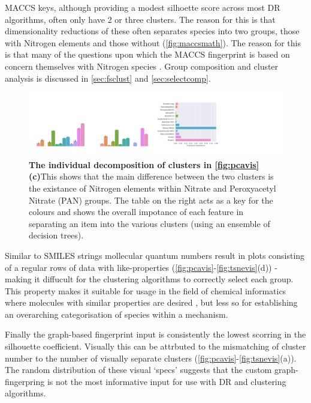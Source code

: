 MACCS keys, although providing a modest silhoette score across most DR algorithms, often only have 2 or three clusters. The reason for this is that dimensionality reductions of these often separates species into two groups, those with Nitrogen elements and those without (\autoref{fig:maccsmath}). The reason for this is that many of the questions upon which the MACCS fingerprint is based on concern themselves with Nitrogen species \citep{rdkitcode}. Group composition and cluster analysis is discussed in \autoref{sec:fsclust} and \autoref{sec:selectcomp}.\\

\begin{figure}[H]
    \includegraphics[width=1.3\textwidth]{outputs/PCA/maccs/group.png}
    \caption{\textbf{The individual decomposition of clusters in \autoref{fig:pcavis}(c)}This shows that the main difference between the two clusters is the existance of Nitrogen elements within Nitrate and Peroxyacetyl Nitrate (PAN) groups. The table on the right acts as a key for the colours and shows the overall impotance of each feature in separating an item into the various clusters (using an ensemble of decision trees).}
    \label{fig:maccsmath}
\end{figure}

Similar to SMILES strings mollecular quantum numbers result in plots consisting of a regular rows of data with like-properties (\autoref{fig:pcavis}-\ref{fig:tsnevis}(d)) - making it diffucult for the clustering algorithms to correctly select each group. This property makes it suitable for usage in the field of chemical informatics where molecules with similar properties are desired \citep{mqnpca}, but less so for establishing an overarching categorisation of species within a mechanism.

Finally the graph-based fingerprint input is consistently the lowest scorring in the silhouette coefficient. Visually this can be attrbuted to the mismatching of cluster number to the number of visually separate clusters  (\autoref{fig:pcavis}-\ref{fig:tsnevis}(a)). The random distribution of these visual `specs' suggests that the custom graph-fingerpring is not the most informative input for use with DR and clustering algorithms.

